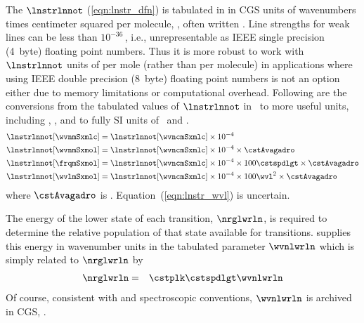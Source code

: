 \documentclass[12pt]{article}
\begin{document}
The  $\lnstrlnnot$ (\ref{eqn:lnstr_dfn}) is
tabulated in  in CGS units of wavenumbers times centimeter
squared per molecule, \wvncmSxmlc, often written \cmxatm. 
Line strengths for weak lines can be less than
$10^{-36}$\,\wvncmSxmlc, i.e., unrepresentable as IEEE single
precision (4~byte) floating point numbers. 
Thus it is more robust to work with $\lnstrlnnot$ units of per mole
(rather than per molecule) in applications where using IEEE double
precision (8~byte) floating point numbers is not an option either due
to memory limitations or computational overhead. 
Following are the conversions from the tabulated values of
$\lnstrlnnot$ in \wvncmSxmlc\ to more useful units, including 
\wvnmSxmlc, \wvnmSxmol, and to fully SI units of \frqmSxmol\ and 
\wvlmSxmol.
\begin{subequations}
\label{eqn:lnstr_units}
\begin{align}
\label{eqn:lnstr_wvn_mlc}
\lnstrlnnot [\mbox{\wvnmSxmlc}] 
& = \lnstrlnnot [\mbox{\wvncmSxmlc}] \times 10^{-4} \\
\label{eqn:lnstr_wvn}
\lnstrlnnot [\mbox{\wvnmSxmol}] 
& = \lnstrlnnot [\mbox{\wvncmSxmlc}] \times 10^{-4} \times \cstAvagadro \\
\label{eqn:lnstr_frq}
\lnstrlnnot [\mbox{\frqmSxmol}] 
& = \lnstrlnnot [\mbox{\wvncmSxmlc}] \times 10^{-4} \times 
100 \cstspdlgt \times \cstAvagadro \\
\label{eqn:lnstr_wvl}
\lnstrlnnot [\mbox{\wvlmSxmol}] 
& = \lnstrlnnot [\mbox{\wvncmSxmlc}] \times 10^{-4} \times
100 \wvl^{2} \times \cstAvagadro
\end{align}
\end{subequations} 
where $\cstAvagadro$ is .
Equation~(\ref{eqn:lnstr_wvl}) is uncertain.

The energy of the lower state of each transition, $\nrglwrln$, is
required to determine the relative population of that state available
for transitions. 
 supplies this energy in wavenumber units in the tabulated
parameter $\wvnlwrln$ which is simply related to $\nrglwrln$ by
\begin{eqnarray}
\nrglwrln & = & \cstplk \cstspdlgt \wvnlwrln
\label{eqn:nrg_lwr_ln_dfn}
\end{eqnarray}
Of course, consistent with  and spectroscopic conventions,
$\wvnlwrln$ is archived in CGS, \xcm.
\end{document}
